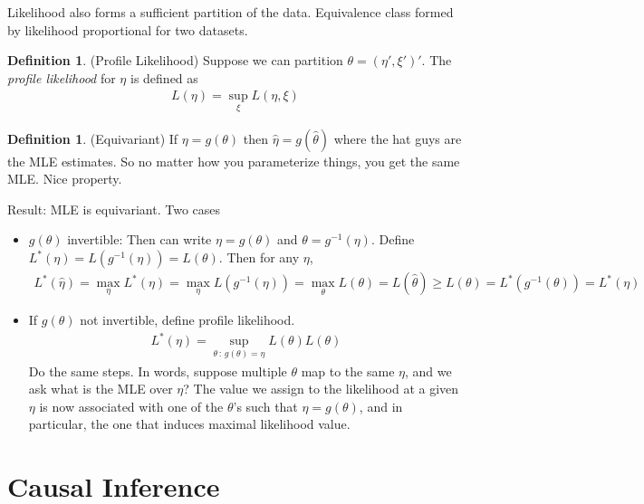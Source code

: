 \documentclass[12pt]{article}
\theoremstyle{plain}
\theoremstyle{definition}
\newtheorem{defn}[thm]{Definition}
\theoremstyle{remark}
\begin{document}
Likelihood also forms a sufficient partition of the data.
Equivalence class formed by likelihood proportional for two datasets.


\begin{defn}
(Profile Likelihood)
Suppose we can partition $\theta=(\eta',\xi')'$.
The \emph{profile likelihood} for $\eta$ is defined as
\begin{align*}
  L(\eta) = \sup_\xi L(\eta,\xi)
\end{align*}
\end{defn}

\begin{defn}(Equivariant)
If $\eta=g(\theta)$ then $\hat{\eta}=g(\hat{\theta})$ where the hat
guys are the MLE estimates.
So no matter how you parameterize things, you get the same MLE. Nice
property.
\end{defn}


Result: MLE is equivariant.
Two cases
\begin{itemize}
  \item $g(\theta)$ invertible:
    Then can write $\eta=g(\theta)$ and $\theta=g^{-1}(\eta)$.
    Define $L^*(\eta)=L(g^{-1}(\eta))=L(\theta)$.
    Then for any $\eta$,
    \begin{align*}
      L^*(\hat{\eta})
      =
      \max_\eta
      L^*(\eta)
      =
      \max_\eta
      L(g^{-1}(\eta))
      =
      \max_\theta
      L(\theta)
      =
      L(\hat{\theta})
      \geq
      L(\theta)
      =
      L^*(g^{-1}(\theta))
      =
      L^*(\eta)
    \end{align*}
  \item If $g(\theta)$ not invertible, define
    profile likelihood.
    \begin{align*}
      L^*(\eta) =
      \sup_{\theta\,:\,g(\theta)=\eta}
      L(\theta)
      L(\theta)
    \end{align*}
    Do the same steps.
    In words, suppose multiple $\theta$ map to the same $\eta$, and we
    ask what is the MLE over $\eta$?
    The value we assign to the likelihood at a given $\eta$ is now
    associated with one of the $\theta$'s such that $\eta=g(\theta)$,
    and in particular, the one that induces maximal likelihood value.
\end{itemize}












\clearpage
\section{Causal Inference}
\end{document}
